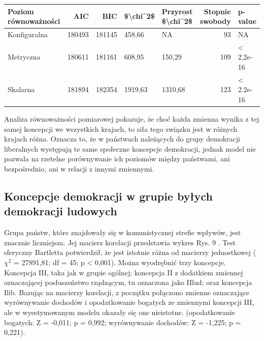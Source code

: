 \documentclass[12pt]{article}
\begin{document}
\begin{tabular}{l|r|r|l|l|r|l}
\hline
Poziom równoważności & AIC & BIC & \$\textbackslash{}chi\textasciicircum{}2\$ & Przyrost \$\textbackslash{}chi\textasciicircum{}2\$ & Stopnie swobody & p-value\\
\hline
Konfiguralna & 180493 & 181145 & 458,66 & NA & 93 & NA\\
\hline
Metryczna & 180611 & 181161 & 608,95 & 150,29 & 109 & < 2,2e-16\\
\hline
Skalarna & 181894 & 182354 & 1919,63 & 1310,68 & 123 & < 2.2e-16\\
\hline
\end{tabular}

Analiza równoważności pomiarowej pokazuje, że choć każda zmienna wynika z tej samej koncepcji we wszystkich krajach, to siła tego związku jest w różnych krajach różna. Oznacza to, że w państwach należących do grupy demokracji liberalnych występują te same społeczne koncepcje demokracji, jednak model nie pozwala na rzetelne porównywanie ich poziomów między państwami, ani bezpośrednio, ani w relacji z innymi zmiennymi.

\hypertarget{koncepcje-demokracji-w-grupie-byux142ych-demokracji-ludowych}{%
\subsection{Koncepcje demokracji w grupie byłych demokracji ludowych}\label{koncepcje-demokracji-w-grupie-byux142ych-demokracji-ludowych}}

Grupa państw, które znajdowały się w komunistycznej strefie wpływów, jest znacznie liczniejsza. Jej macierz korelacji przedstawia wykres Rys. 9 . Test sferyczny Bartletta potwierdził, że jest istotnie różna od macierzy jednostkowej (\(\chi^2\) = 27891,81; df = 45; p \textless{} 0,001). Można wyodrębnić trzy koncepcje. Koncepcja III, taka jak w grupie ogólnej; koncepcja II z dodatkiem zmiennej oznaczającej posłuszeństwo rządzącym, tu oznaczona jako IIlud; oraz koncepcja Ilib. Bazując na macierzy korelacji, z początku połączono zmienne oznaczające wyrównywanie dochodów i opodatkowanie bogatych ze zmiennymi koncepcji III, ale w wyestymowanym modelu okazały się one nieistotne. (opodatkowanie bogatych: Z = -0,011; p = 0,992; wyrównywanie dochodów: Z = -1,225; p = 0,221).
\end{document}
